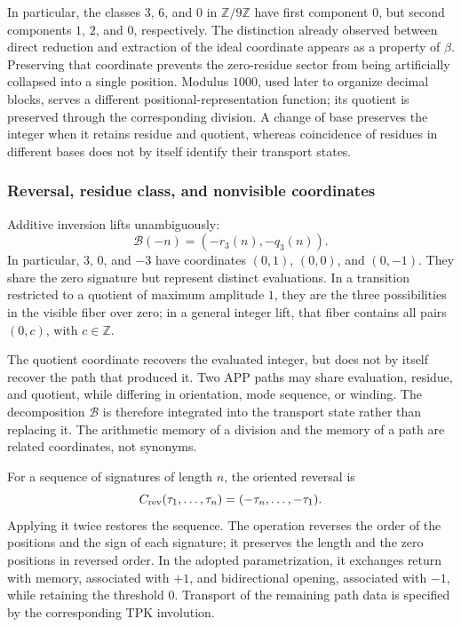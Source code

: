 In particular, the classes \(3\), \(6\), and \(0\) in
\(\mathbb Z/9\mathbb Z\) have first component \(0\), but second
components \(1\), \(2\), and \(0\), respectively. The distinction already observed
between direct reduction and extraction of the ideal coordinate appears
as a property of \(\beta\). Preserving that coordinate prevents the
zero-residue sector from being artificially collapsed into a single position.
Modulus \(1000\), used later to organize decimal blocks,
serves a different positional-representation function; its quotient is preserved
through the corresponding division. A change of base preserves the integer
when it retains residue and quotient, whereas coincidence of residues
in different bases does not by itself identify their transport states.

\subsubsection{Reversal, residue class, and nonvisible coordinates}
\label{trit-ampl-inversion}

Additive inversion lifts unambiguously:
\[
 \mathcal B(-n)=(-r_3(n),-q_3(n)).
\]
In particular, \(3\), \(0\), and \(-3\) have coordinates
\((0,1)\), \((0,0)\), and \((0,-1)\). They share the zero signature but represent
distinct evaluations. In a transition restricted to a quotient of
maximum amplitude \(1\), they are the three possibilities in the visible fiber over
zero; in a general integer lift, that fiber contains all pairs
\((0,c)\), with \(c\in\mathbb Z\).

The quotient coordinate recovers the evaluated integer, but does not by
itself recover the path that produced it. Two APP paths may share
evaluation, residue, and quotient, while differing in orientation, mode sequence, or
winding. The decomposition \(\mathcal B\) is therefore integrated into the
transport state rather than replacing it. The arithmetic memory of a
division and the memory of a path are related coordinates, not
synonyms.

For a sequence of signatures of length \(n\), the oriented reversal is
\[
 C_{\rm rev}(\tau_1,\ldots,\tau_n)
   =(-\tau_n,\ldots,-\tau_1).
\]
Applying it twice restores the sequence. The operation reverses the order of
the positions and the sign of each signature; it preserves the length and the
zero positions in reversed order. In the adopted parametrization, it
exchanges return with memory, associated with \(+1\), and bidirectional
opening, associated with \(-1\), while retaining the threshold \(0\). Transport
of the remaining path data is specified by the
corresponding TPK involution.

